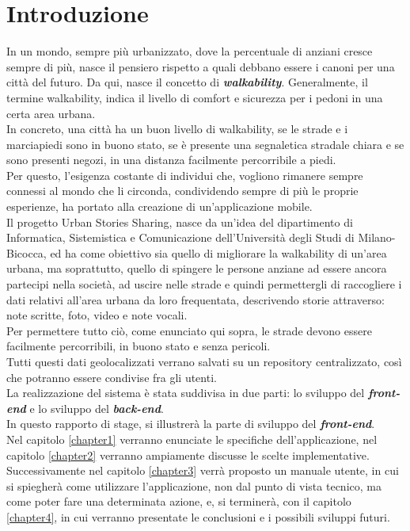 \chapter*{Introduzione}
In un mondo, sempre più urbanizzato, dove la percentuale di anziani cresce sempre di più, nasce il pensiero rispetto a quali debbano essere i canoni per una città del futuro. Da qui, nasce il concetto di \textit{\textbf{walkability}}. Generalmente, il termine walkability, indica il livello di comfort e sicurezza per i pedoni in una certa area urbana.
\\In concreto, una città ha un buon livello di walkability, se le strade e i marciapiedi sono in buono stato, se è presente una segnaletica stradale chiara e se sono presenti negozi, in una distanza facilmente percorribile a piedi.
\\Per questo, l'esigenza costante di individui che, vogliono rimanere sempre connessi al mondo che li circonda, condividendo sempre di più le proprie esperienze, ha portato alla creazione di un'applicazione mobile.
\\Il progetto Urban Stories Sharing, nasce da un'idea del dipartimento di Informatica, Sistemistica e Comunicazione dell'Università degli Studi di Milano-Bicocca, ed ha come obiettivo sia quello di migliorare la walkability di un'area urbana, ma soprattutto, quello di spingere le persone anziane ad essere ancora partecipi nella società, ad uscire nelle strade e quindi permettergli di raccogliere i dati relativi all'area urbana da loro frequentata, descrivendo storie attraverso: note scritte, foto, video e note vocali.
\\Per permettere tutto ciò, come enunciato qui sopra, le strade devono essere facilmente percorribili, in buono stato e senza pericoli.
\\Tutti questi dati geolocalizzati verrano salvati su un repository centralizzato, così che potranno essere condivise fra gli utenti.
\\La realizzazione del sistema è stata suddivisa in due parti: lo sviluppo del \textit{\textbf{front-end}} e lo sviluppo del \textit{\textbf{back-end}}.
\\In questo rapporto di stage, si illustrerà la parte di sviluppo del \textit{\textbf{front-end}}.
\\Nel capitolo \ref{chapter1} verranno enunciate le specifiche dell'applicazione, nel capitolo \ref{chapter2} verranno ampiamente discusse le scelte implementative.
\\Successivamente nel capitolo \ref{chapter3} verrà proposto un manuale utente, in cui si spiegherà come utilizzare l'applicazione, non dal punto di vista tecnico, ma come poter fare una determinata azione, e, si terminerà, con il capitolo \ref{chapter4}, in cui verranno presentate le conclusioni e i possibili sviluppi futuri.

